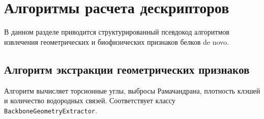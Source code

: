\documentclass[12pt, a4paper]{article}
\begin{document}
\newpage

\section{Алгоритмы расчета дескрипторов}

В данном разделе приводится структурированный псевдокод алгоритмов извлечения геометрических и биофизических признаков белков de novo.

\subsection{Алгоритм экстракции геометрических признаков}
Алгоритм вычисляет торсионные углы, выбросы Рамачандрана, плотность клэшей и количество водородных связей. Соответствует классу \texttt{Backbone}\-\texttt{Geometry}\-\texttt{Extractor}.
\end{document}
